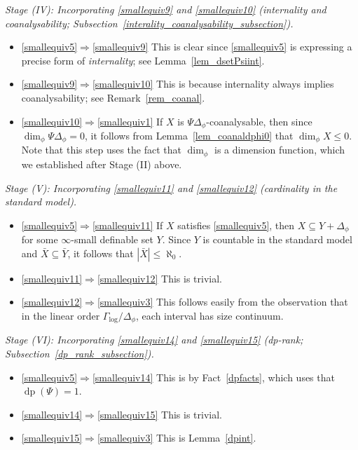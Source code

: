 \documentclass[11pt]{amsart}
\theoremstyle{plain}
\theoremstyle{definition}
\numberwithin{equation}{section}
\newcommand\0{\varnothing}
\begin{document}
\emph{Stage (IV): Incorporating \eqref{smallequiv9} and \eqref{smallequiv10} (internality and coanalysability; Subsection~\ref{interality_coanalysability_subsection}).}
\begin{itemize}
\item \eqref{smallequiv5}$\Rightarrow$\eqref{smallequiv9} This is clear since \eqref{smallequiv5} is expressing a precise form of \emph{internality}; see Lemma~\ref{lem_dsetPsiint}.
\item \eqref{smallequiv9}$\Rightarrow$\eqref{smallequiv10} This is because internality always implies coanalysability; see Remark~\ref{rem_coanal}.
\item \eqref{smallequiv10}$\Rightarrow$\eqref{smallequiv1} If $X$ is $\Psi\Delta_{\phi}$-coanalysable, then since $\dim_{\phi}\Psi\Delta_{\phi}=0$, it follows from Lemma~\ref{lem_coanaldphi0} that $\dim_{\phi}X\leq 0$. Note that this step uses the fact that $\dim_{\phi}$ is a dimension function, which we established after Stage (II) above.
\end{itemize}

\emph{Stage (V): Incorporating \eqref{smallequiv11} and \eqref{smallequiv12} (cardinality in the standard model).}
\begin{itemize}
\item \eqref{smallequiv5}$\Rightarrow$\eqref{smallequiv11} If $X$ satisfies \eqref{smallequiv5}, then $X\subseteq Y+\Delta_{\phi}$ for some $\infty$-small definable set $Y$. 
Since $Y$ is countable in the standard model and $\bar{X}\subseteq \bar{Y}$, it follows that $|\bar{X}|\leq\aleph_0$.
\item \eqref{smallequiv11}$\Rightarrow$\eqref{smallequiv12} This is trivial.
\item \eqref{smallequiv12}$\Rightarrow$\eqref{smallequiv3} This follows easily from the observation that in the linear order $\Gamma_{\log}/\Delta_{\phi}$, each interval has size continuum.
\end{itemize}

\emph{Stage (VI): Incorporating \eqref{smallequiv14} and \eqref{smallequiv15} (dp-rank; Subsection~\ref{dp_rank_subsection}).}
\begin{itemize}
\item \eqref{smallequiv5}$\Rightarrow$\eqref{smallequiv14} This is by Fact~\ref{dpfacts}, which uses that $\operatorname{dp}(\Psi)=1$.
\item \eqref{smallequiv14}$\Rightarrow$\eqref{smallequiv15} This is trivial.
\item \eqref{smallequiv15}$\Rightarrow$\eqref{smallequiv3} This is Lemma~\ref{dpint}.
\end{itemize}
\end{document}
